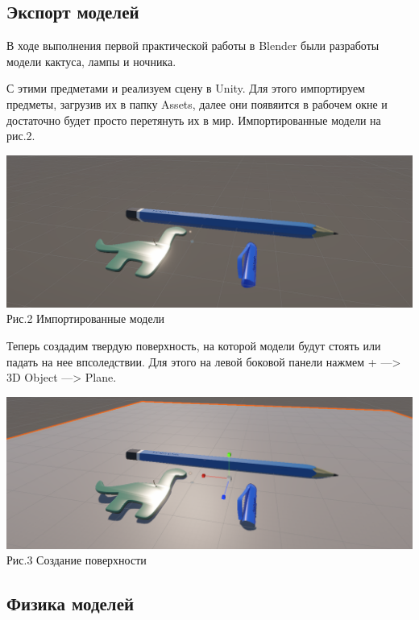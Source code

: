 \documentclass[a4paper,12pt]{article}
\begin{document}
\subsection{Экспорт моделей}

В ходе выполнения первой практической работы в Blender были разработы модели кактуса, лампы и ночника.

С этими предметами и реализуем сцену в Unity. Для этого импортируем предметы, загрузив их в папку Assets, далее они появяится в рабочем окне и достаточно будет просто перетянуть их в мир. Импортированные модели на рис.2.


\begin{center}
	\includegraphics[scale = 0.4]{2.png}\\
	Рис.2 Импортированные модели
\end{center}

Теперь создадим твердую поверхность, на которой модели будут стоять или падать на нее впсоледствии. Для этого на левой боковой панели нажмем + —> 3D Object —> Plane. 

\begin{center}
	\includegraphics[scale = 0.4]{3.png}\\
	Рис.3 Создание поверхности
\end{center}

\subsection{Физика моделей}
\end{document}
